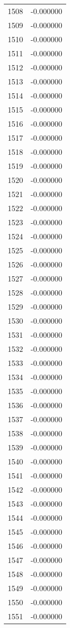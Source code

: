 \documentclass[12pt]{article}
\begin{document}
\begin{longtable}{@{}cc@{}}
1508 & -0.000000 \\
1509 & -0.000000 \\
1510 & -0.000000 \\
1511 & -0.000000 \\
1512 & -0.000000 \\
1513 & -0.000000 \\
1514 & -0.000000 \\
1515 & -0.000000 \\
1516 & -0.000000 \\
1517 & -0.000000 \\
1518 & -0.000000 \\
1519 & -0.000000 \\
1520 & -0.000000 \\
1521 & -0.000000 \\
1522 & -0.000000 \\
1523 & -0.000000 \\
1524 & -0.000000 \\
1525 & -0.000000 \\
1526 & -0.000000 \\
1527 & -0.000000 \\
1528 & -0.000000 \\
1529 & -0.000000 \\
1530 & -0.000000 \\
1531 & -0.000000 \\
1532 & -0.000000 \\
1533 & -0.000000 \\
1534 & -0.000000 \\
1535 & -0.000000 \\
1536 & -0.000000 \\
1537 & -0.000000 \\
1538 & -0.000000 \\
1539 & -0.000000 \\
1540 & -0.000000 \\
1541 & -0.000000 \\
1542 & -0.000000 \\
1543 & -0.000000 \\
1544 & -0.000000 \\
1545 & -0.000000 \\
1546 & -0.000000 \\
1547 & -0.000000 \\
1548 & -0.000000 \\
1549 & -0.000000 \\
1550 & -0.000000 \\
1551 & -0.000000 \\

\end{longtable}
\end{document}
